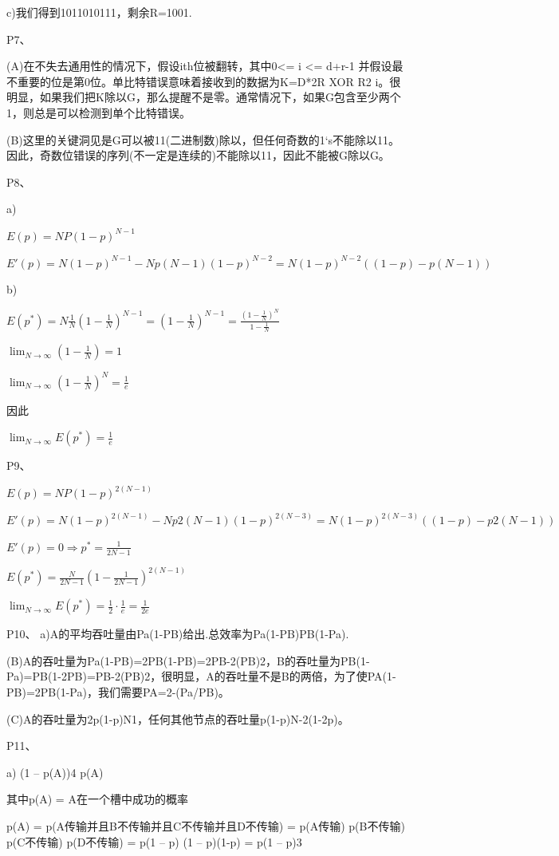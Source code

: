 \documentclass[11pt,UTF8,twoside]{article}
\begin{document}
{		c)我们得到1011010111，剩余R=1001. 
		
		
		P7、
		
		(A)在不失去通用性的情况下，假设ith位被翻转，其中0<= i <= d+r-1 并假设最不重要的位是第0位。单比特错误意味着接收到的数据为K=D*2R XOR R2 i。很明显，如果我们把K除以G，那么提醒不是零。通常情况下，如果G包含至少两个1，则总是可以检测到单个比特错误。
		
		(B)这里的关键洞见是G可以被11(二进制数)除以，但任何奇数的1‘s不能除以11。因此，奇数位错误的序列(不一定是连续的)不能除以11，因此不能被G除以G。
		
		P8、
		
		a)
		
		$E(p)=NP(1-p)^{N-1}$
		
		$E'(p)=N(1-p)^{N-1}-Np(N-1)(1-p)^{N-2}=N(1-p)^{N-2}((1-p)-p(N-1))$
		
		b) 
		
		$E(p^\ast )=N\frac{1}{N}(1-\frac{1}{N})^{N-1}=(1-\frac{1}{N})^{N-1}=\frac{(1-\frac{1}{N})^N}{1-\frac{1}{N}}$
		
		$\lim_{N \to \infty }(1-\frac{1}{N})=1$
		
		$\lim_{N \to \infty }(1-\frac{1}{N})^N=\frac{1}{e}$
		
		因此
		
		$\lim_{N \to \infty }E(p^\ast )=\frac{1}{e}$
		
		P9、
		
		$E(p)=NP(1-p)^{2(N-1)}$
		
		$E'(p)=N(1-p)^{2(N-1)}-Np2(N-1)(1-p)^{2(N-3)}=N(1-p)^{2(N-3)}((1-p)-p2(N-1))$
		
		$E'(p)=0\Rightarrow p^*=\frac{1}{2N-1}$
		
		$E(p^*)=\frac{N}{2N-1}(1-\frac{1}{2N-1})^{2(N-1)}$
		
		$\lim_{N \to \infty }E(p^*)=\frac{1}{2}\cdot \frac{1}{e}=\frac{1}{2e}$
		
		P10、
		a)A的平均吞吐量由Pa(1-PB)给出.总效率为Pa(1-PB)PB(1-Pa).
		
		(B)A的吞吐量为Pa(1-PB)=2PB(1-PB)=2PB-2(PB)2，B的吞吐量为PB(1-Pa)=PB(1-2PB)=PB-2(PB)2，很明显，A的吞吐量不是B的两倍，为了使PA(1-PB)=2PB(1-Pa)，我们需要PA=2-(Pa/PB)。
		
		(C)A的吞吐量为2p(1-p)N1，任何其他节点的吞吐量p(1-p)N-2(1-2p)。
		
		P11、
		
		a) (1 – p(A))4 p(A) 
		
		其中p(A) = A在一个槽中成功的概率 
		
		p(A) = p(A传输并且B不传输并且C不传输并且D不传输) = p(A传输) p(B不传输) p(C不传输) p(D不传输) = p(1 – p) (1 – p)(1-p) = p(1 – p)3 
		
}
\end{document}
